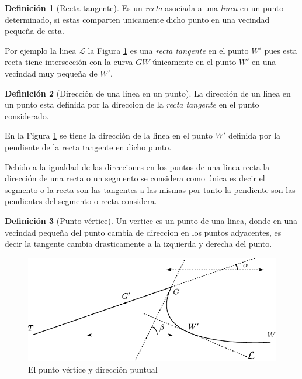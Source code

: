 \documentclass[16pt,]{krantz}
\theoremstyle{definition}
\newtheorem{definition}{Definición}[chapter]
\theoremstyle{definition}
\theoremstyle{definition}
\theoremstyle{definition}
\theoremstyle{remark}
\begin{document}
\begin{definition}[Recta tangente]
\protect\hypertarget{def:tangentew}{}{\label{def:tangentew} {} }Es un \emph{recta} asociada a una \emph{linea} en un punto determinado, si estas comparten unicamente dicho punto en una vecindad pequeña de esta.
\end{definition}

Por ejemplo la linea \(\mathcal{L}\) la Figura \ref{fig:tangente} es una \emph{recta tangente} en el punto \(W'\) pues esta recta tiene intersección con la curva \(GW\) únicamente en el punto \(W'\) en una vecindad muy pequeña de \(W'\).

\begin{definition}[Dirección de una linea en un punto]
\protect\hypertarget{def:direccion}{}{\label{def:direccion} {} }La dirección de un linea en un punto esta definida por la direccion de la \emph{recta tangente} en el punto considerado.
\end{definition}

En la Figura \ref{fig:tangente} se tiene la dirección de la linea en el punto \(W'\) definida por la pendiente de la recta tangente en dicho punto.

Debido a la igualdad de las direcciones en los puntos de una linea recta la dirección de una recta o un segmento se considera como única es decir el segmento o la recta son las tangentes a las mismas por tanto la pendiente son las pendientes del segmento o recta considera.

\begin{definition}[Punto vértice]
\protect\hypertarget{def:puntovertice}{}{\label{def:puntovertice} {} }Un vertice es un punto de una linea, donde en una vecindad pequeña del punto cambia de direccion en los puntos adyacentes, es decir la tangente cambia drasticamente a la izquierda y derecha del punto.
\end{definition}

\begin{figure}[!ht]

{\centering \includegraphics{tangente} 

}

\caption{El punto vértice y dirección puntual}\label{fig:tangente}
\end{figure}
\end{document}
